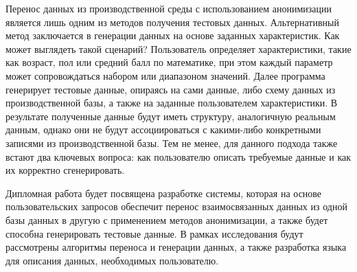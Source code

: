 Перенос данных из производственной среды с использованием анонимизации является лишь одним из методов получения тестовых данных. Альтернативный метод заключается в генерации данных на основе заданных характеристик. Как может выглядеть такой сценарий? Пользователь определяет характеристики, такие как возраст, пол или средний балл по математике, при этом каждый параметр может сопровождаться набором или диапазоном значений. Далее программа генерирует тестовые данные, опираясь на сами данные, либо схему данных из производственной базы, а также на заданные пользователем характеристики. В результате полученные данные будут иметь структуру, аналогичную реальным данным, однако они не будут ассоциироваться с какими-либо конкретными записями из производственной базы. Тем не менее, для данного подхода также встают два ключевых вопроса: как пользователю описать требуемые данные и как их корректно сгенерировать.

Дипломная работа будет посвящена разработке системы, которая на основе пользовательских запросов обеспечит перенос взаимосвязанных данных из одной базы данных в другую с применением методов анонимизации, а также будет способна генерировать тестовые данные. В рамках исследования будут рассмотрены алгоритмы переноса и генерации данных, а также разработка языка для описания данных, необходимых пользователю.

